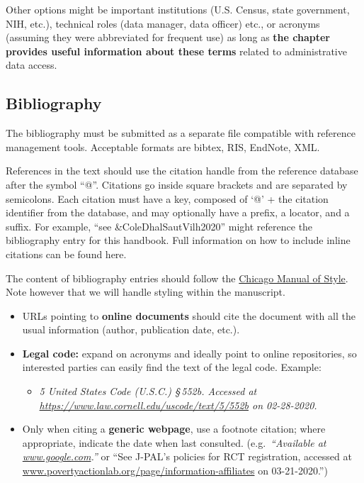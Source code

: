 \documentclass[
]{book}
\providecommand{\tightlist}{%
  \setlength{\itemsep}{0pt}\setlength{\parskip}{0pt}}
\begin{document}
Other options might be important institutions (U.S. Census, state government, NIH, etc.), technical roles (data manager, data officer) etc., or acronyms (assuming they were abbreviated for frequent use) as long as \textbf{the chapter provides useful information about these terms} related to administrative data access.

\hypertarget{bibliography}{%
\subsection*{Bibliography}\label{bibliography}}

The bibliography must be submitted as a separate file compatible with reference management tools. Acceptable formats are bibtex, RIS, EndNote, XML.

References in the text should use the citation handle from the reference database after the symbol ``@''. Citations go inside square brackets and are separated by semicolons. Each citation must have a key, composed of `@' + the citation identifier from the database, and may optionally have a prefix, a locator, and a suffix. For example, ``see \&ColeDhalSautVilh2020'' might reference the bibliography entry for this handbook. Full information on how to include inline citations can be found here.

The content of bibliography entries should follow the \href{https://www.chicagomanualofstyle.org/tools_citationguide/citation-guide-2.html}{Chicago Manual of Style}. Note however that we will handle styling within the manuscript.

\begin{itemize}
\tightlist
\item
  URLs pointing to \textbf{online documents} should cite the document with all the usual information (author, publication date, etc.).
\item
  \textbf{Legal code:} expand on acronyms and ideally point to online repositories, so interested parties can easily find the text of the legal code. Example:

  \begin{itemize}
  \tightlist
  \item
    \emph{5 United States Code (U.S.C.) §\,552b. Accessed at} \emph{\url{https://www.law.cornell.edu/uscode/text/5/552b} on 02-28-2020.}
  \end{itemize}
\item
  Only when citing a \textbf{generic webpage}, use a footnote citation; where appropriate, indicate the date when last consulted. (e.g.~\emph{``Available at \href{http://www.google.com/}{www.google.com}.''} or ``See J-PAL's policies for RCT registration, accessed at \href{http://www.povertyactionlab.org/page/information-affiliates}{www.povertyactionlab.org/page/information-affiliates} on 03-21-2020.'')
\end{itemize}
\end{document}
